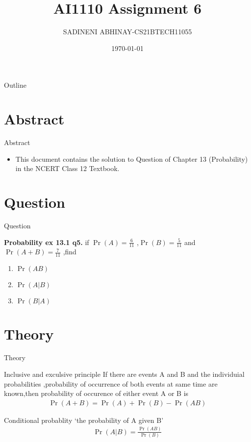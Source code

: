 \documentclass{beamer}
\title{AI1110 Assignment 6}
\author{SADINENI ABHINAY-CS21BTECH11055}
\date{\today}
\providecommand{\pr}[1]{\ensuremath{\Pr\left(#1\right)}}
\begin{document}
	
	\begin{frame}
		\titlepage
	\end{frame}

\begin{frame}{Outline}
  \tableofcontents
\end{frame}

\section{Abstract}
	\begin{frame}{Abstract}
		\begin{itemize}
			\item 	This document contains the solution to Question of Chapter 13 (Probability) in the NCERT Class 12 Textbook.
		\end{itemize}
	\end{frame}
	
	\section{Question}
	\begin{frame}{Question}
		\begin{block}{\textbf{Probability  ex 13.1 q5.}}
			 if $\pr{A}=\frac{6}{11}$ ,$\pr{B}=\frac{5}{11}$  and $\pr{A+ B}=\frac{7}{11}$ ,find
			\begin{enumerate}
				\item $\pr{AB}$
				\item$\pr{A|B}$
				\item$\pr{B|A}$
			\end{enumerate}
		\end{block}
	
	\end{frame}
	

	\section{Theory}
	\begin{frame}{Theory}
			 \begin{block}{Inclusive and exculsive principle}
			If there are events A and B and the individuial probabilities ,probability of occurrence of both events at same time are known,then probability of occurence of either event A or B is 
			\begin{align}
				\pr{A+B}=\pr{A}+\pr{B}-\pr{AB}
				\end{align}
			\end{block}
			\begin{block}{Conditional probablity}
			‘the probability of A given B'
			\begin{align}
				\pr{A|B}=\frac{\pr{AB}}{\pr{B}}
			\end{align}
		\end{block}	   
	\end{frame}
\end{document}
